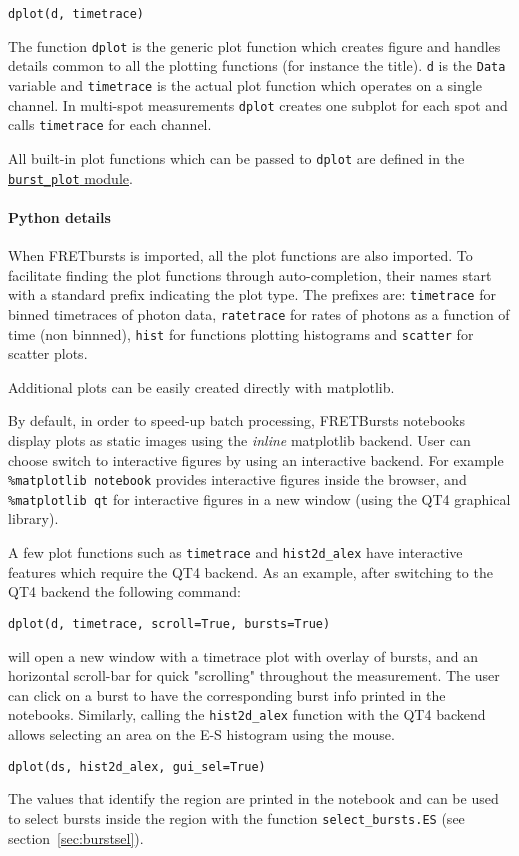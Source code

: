 \begin{lstlisting}
dplot(d, timetrace)
\end{lstlisting}

The function \verb|dplot| is the generic plot function which creates figure
and handles details common to all the plotting functions (for instance the title).
\verb|d| is the \verb|Data| variable and \verb|timetrace| is the actual plot
function which operates on a single channel. In multi-spot measurements
\verb|dplot| creates one subplot for each spot and calls \verb|timetrace| for
each channel.

All built-in plot functions which can be passed to
\verb|dplot| are defined in the
\href{http://fretbursts.readthedocs.org/en/latest/plots.html}{\texttt{burst\_plot} module}.

\paragraph{Python details}

When FRETbursts is imported, all the plot functions are also imported.
To facilitate finding the plot functions through auto-completion,
their names start with a standard prefix indicating the
plot type. The prefixes are: \verb|timetrace| for binned timetraces
of photon data, \verb|ratetrace| for rates of photons as a function of time (non
binnned), \verb|hist| for functions plotting histograms and \verb|scatter| for
scatter plots.

Additional plots can be easily created directly with matplotlib.

By default, in order to speed-up batch processing, FRETBursts notebooks display plots 
as static images using the \textit{inline} matplotlib backend. 
User can choose switch to interactive figures by using an interactive backend. 
For example \verb|%matplotlib notebook| 
provides interactive figures inside the browser, 
and \verb|%matplotlib qt| 
for interactive figures in a new window (using the QT4 graphical library).

A few plot functions such as \verb|timetrace| and \verb|hist2d_alex| have interactive features 
which require the QT4 backend. As an example, after switching to the QT4 backend
the following command:

\begin{lstlisting}
dplot(d, timetrace, scroll=True, bursts=True)
\end{lstlisting}

\noindent
will open a new window with a timetrace plot with overlay of bursts, and an horizontal scroll-bar for quick
"scrolling" throughout the measurement. The user can click on a burst to have the corresponding burst info 
printed in the notebooks.
Similarly, calling the \verb|hist2d_alex| function with the QT4 backend allows
selecting an area on the E-S histogram using the mouse.

\begin{lstlisting}
dplot(ds, hist2d_alex, gui_sel=True)
\end{lstlisting}

The values that identify the region are printed in the notebook and can be used 
to select bursts inside the region with the function \verb|select_bursts.ES| (see
section~\ref{sec:burstsel}).
